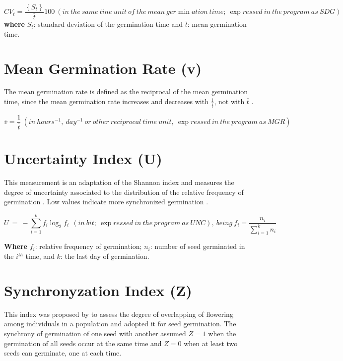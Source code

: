 \documentclass[]{book}
\begin{document}
\[CV_t=\frac{\left\{S_t\right\}}{\overline{t}}100\ \left(in\ the\ same\ tine\ unit\ of\ the\ mean\ ger\min ation\ time;\ \exp ressed\ in\ the\ program\ as\ SDG\right)\]
\textbf{where} \(S_t\): standard deviation of the germination time and
\(\overline{t}\): mean germination time.

\section{Mean Germination Rate (v)}\label{mean-germination-rate-v}

The mean germination rate is defined as the reciprocal of the mean
germination time, since the mean germination rate increases and
decreases with \(\frac{1}{\overline{t}}\), not with \(\overline{t}\)
\citep{Labouriau1983b}.

\[ \overline{v}=\frac{1}{\overline{t}}\ \left(in\ hours^{-1},\ day^{-1}\ or\ other\ reciprocal\ time\ unit,\ \exp ressed\ in\ the\ program\ as\ MGR\right) \]

\section{Uncertainty Index (U)}\label{uncertainty-index-u}

This measurement is an adaptation of the Shannon index and measures the
degree of uncertainty associated to the distribution of the relative
frequency of germination \citep{labouriau1976physiology}. Low values
indicate more synchronized germination \citep{Ranal2006}.

\[U\ =\ -\sum_{i=1}^kf_i\log_2f_i\ \ \left(in\ bit;\ \exp ressed\ in\ the\ program\ as\ UNC\right),\ being\ f_i=\frac{n_i}{\sum_{i=1}^kn_i}\]

\textbf{Where} \(f_i\): relative frequency of germination; \(n_i\):
number of seed germinated in the \(i^{th}\) time, and \(k\): the last
day of germination.

\section{Synchronyzation Index (Z)}\label{synchronyzation-index-z}

This index was proposed by \citet{primack1985patterns} to assess the
degree of overlapping of flowering among individuals in a population and
\citet{Ranal2006} adopted it for seed germination. The synchrony of
germination of one seed with another assumed \(Z=1\) when the
germination of all seeds occur at the same time and \(Z = 0\) when at
least two seeds can germinate, one at each time.
\end{document}

